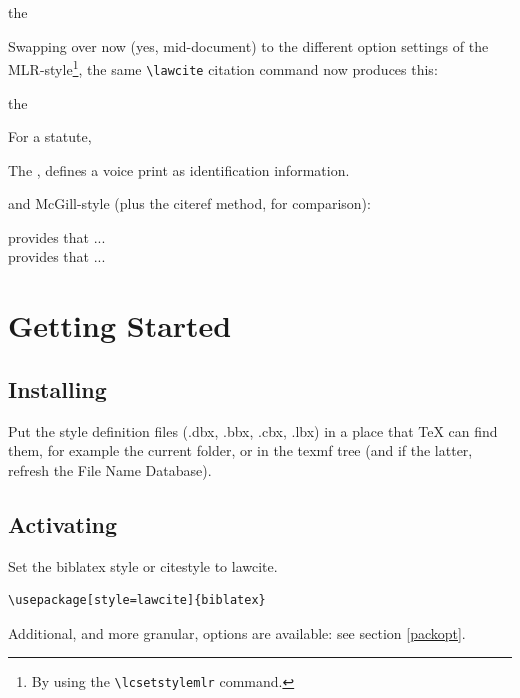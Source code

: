 \begin{mdframed}[default]
the 
\end{mdframed}
\bigskip
Swapping over now (yes, mid-document) to the different option settings of the MLR-style\footnote{By using the \texttt{\textbackslash lcsetstylemlr} command.}, the same \texttt{\textbackslash lawcite} citation command now produces this:

\lcsetstylemlr
\begin{mdframed}[default]
the  
\end{mdframed}
\bigskip
\lcsetstyledefault

For a statute, 

\begin{mdframed}[default]
The , defines a voice print as identification information.
\end{mdframed}
\bigskip

and McGill-style (plus the citeref method, for comparison): \lcsetstylemcgill

\begin{mdframed}[default]
 provides that ...\\
 provides that ...
\end{mdframed}
\bigskip

\lcsetstyledefault

\section{Getting Started}
\subsection{Installing}
Put the style definition files (.dbx, .bbx, .cbx, .lbx) in a place that TeX can find them, for example the current folder, or in the texmf tree (and if the latter, refresh the File Name Database).

\subsection{Activating}
Set the biblatex style or citestyle to lawcite.

\begin{verbatim}
\usepackage[style=lawcite]{biblatex}
\end{verbatim}
Additional, and more granular, options are available: see section \ref{packopt}.


